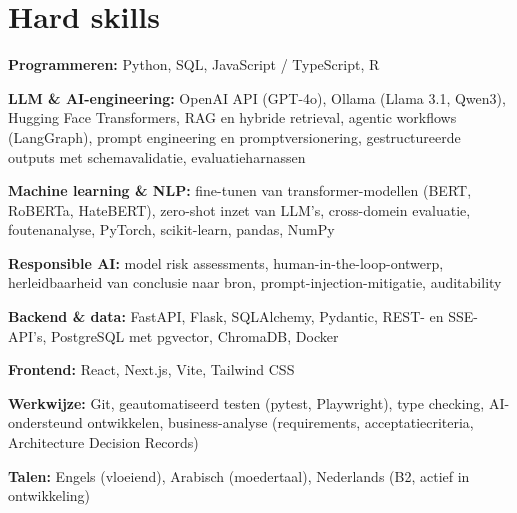 \documentclass[10pt]{article}
\begin{document}
\section*{Hard skills}
\vspace{1pt}
{\small
\textbf{Programmeren:} Python, SQL, JavaScript / TypeScript, R\par\vspace{1.5pt}
\textbf{LLM \& AI-engineering:} OpenAI API (GPT-4o), Ollama (Llama 3.1, Qwen3), Hugging Face Transformers, RAG en hybride retrieval, agentic workflows (LangGraph), prompt engineering en promptversionering, gestructureerde outputs met schemavalidatie, evaluatieharnassen\par\vspace{1.5pt}
\textbf{Machine learning \& NLP:} fine-tunen van transformer-modellen (BERT, RoBERTa, HateBERT), zero-shot inzet van LLM's, cross-domein evaluatie, foutenanalyse, PyTorch, scikit-learn, pandas, NumPy\par\vspace{1.5pt}
\textbf{Responsible AI:} model risk assessments, human-in-the-loop-ontwerp, herleidbaarheid van conclusie naar bron, prompt-injection-mitigatie, auditability\par\vspace{1.5pt}
\textbf{Backend \& data:} FastAPI, Flask, SQLAlchemy, Pydantic, REST- en SSE-API's, PostgreSQL met pgvector, ChromaDB, Docker\par\vspace{1.5pt}
\textbf{Frontend:} React, Next.js, Vite, Tailwind CSS\par\vspace{1.5pt}
\textbf{Werkwijze:} Git, geautomatiseerd testen (pytest, Playwright), type checking, AI-ondersteund ontwikkelen, business-analyse (requirements, acceptatiecriteria, Architecture Decision Records)\par\vspace{1.5pt}
\textbf{Talen:} Engels (vloeiend), Arabisch (moedertaal), Nederlands (B2, actief in ontwikkeling)}

\end{document}
